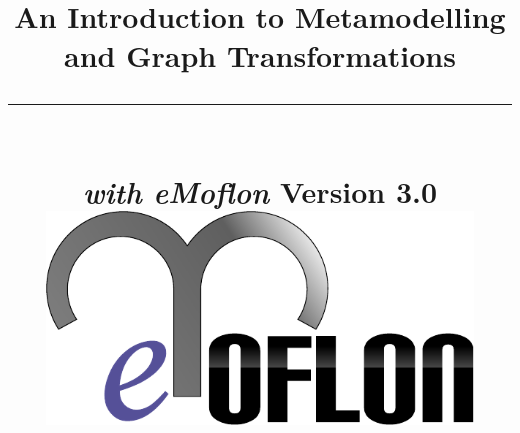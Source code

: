 \title{
\flushright
{\LARGE\bfseries An Introduction to Metamodelling\\
and Graph Transformations}
\noindent\rule[-1ex]{\textwidth}{5pt}\\[2.5ex]
\hfill\emph{\LARGE\bfseries with eMoflon}
\flushleft
{\small Version 3.0}
\flushright
\includegraphics[width=0.85\textwidth]{pics/eMoflon3} 
}

\date{}  
\author{} 